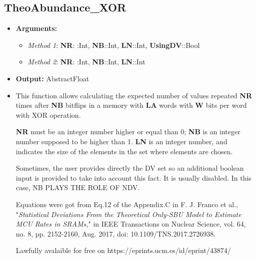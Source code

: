 \subsection*{TheoAbundance\_XOR}
%
\begin{itemize}
	\item \textbf{Arguments:}
		\begin{itemize}
			\item \textit{Method 1}: \textbf{NR}: :Int, \textbf{NB}::Int, \textbf{LN}::Int, \textbf{UsingDV}::Bool
			\item \textit{Method 2}: \textbf{NR}: :Int, \textbf{NB}::Int, \textbf{LN}::Int
		\end{itemize}
	\item \textbf{Output:} AbstractFloat
	\item This function allows calculating the expected number of values repeated 	 \textbf{NR} times after \textbf{NB} bitflips in a memory with \textbf{LA} words with \textbf{W} bits per word
	 with XOR operation.
	
	 \textbf{NR} must be an integer number higher or equal than 0; 
	 \textbf{NB} is an integer number supposed to be higher than 1.
	 \textbf{LN} is an integer number, and indicates the size of the elements in the set
	 where elements are chosen.
	
	 Sometimes, the user provides directly the DV set so an additional boolean
	 input is provided to take into account this fact. It is usually disabled. In this
	 case, NB PLAYS THE ROLE OF NDV.
	 
	 Equations were got from Eq.12 of the Appendix.C in 
	 F. J. Franco et al., "\textit{Statistical Deviations From the Theoretical Only-SBU
	 Model to Estimate MCU Rates in SRAMs,}" in IEEE Transactions on Nuclear
	 Science, vol. 64, no. 8, pp. 2152-2160, Aug. 2017,
	 doi: 10.1109/TNS.2017.2726938. 
	
	 Lawfully avalaible for free on https://eprints.ucm.es/id/eprint/43874/
\end{itemize}
%
